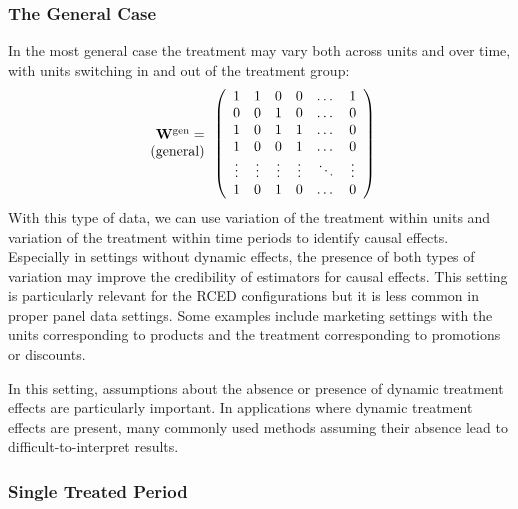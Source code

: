 \documentclass[letterpaper,12pt,leqno]{article}
\newcommand{\gen}{{\rm gen}}
\newcommand{\ttock}{1}
\newcommand{\ttick}{0}
\newcommand{\bw}{{\bf W}}
\begin{document}
\subsubsection{The General Case}\label{general}

In the most general case the treatment may vary both across units and over time, with units switching in and out of the treatment group:
\begin{equation}\label{eq:general}
\begin{array}{r}\bw^\gen=\\ 
({\rm general})
\end{array}\left(
\begin{array}{cccccccc}
	{\ttock} & {\ttock} & \ttick  & \ttick & \dots & {\ttock} \\
	\ttick  & \ttick & {\ttock} & \ttick   & \dots & \ttick  \\
	{\ttock}  & \ttick & {\ttock}  & \ttock  & \dots & \ttick  \\
	{\ttock}  & \ttick & \ttick & {\ttock}   & \dots & \ttick  \\
	\vdots   &  \vdots  &  \vdots& \vdots &\ddots &\vdots \\
	{\ttock}  & \ttick & {\ttock}   & \ttick & \dots & \ttick  \\
\end{array}
\right)
\end{equation}
With this type of data, we can use variation of the treatment within units and variation of the treatment within time periods to identify causal effects. Especially in settings without dynamic effects, the presence of both types of variation may improve the credibility of estimators for causal effects. This setting is particularly relevant for the RCED configurations but it is less common in proper panel data settings. Some examples include marketing settings with the units corresponding to products and the treatment corresponding to promotions or discounts.

In this setting, assumptions about the absence or presence of dynamic treatment effects are particularly important. In applications where dynamic treatment effects are present, many commonly used methods assuming their absence lead to difficult-to-interpret results.

\subsubsection{Single Treated Period}
\end{document}
